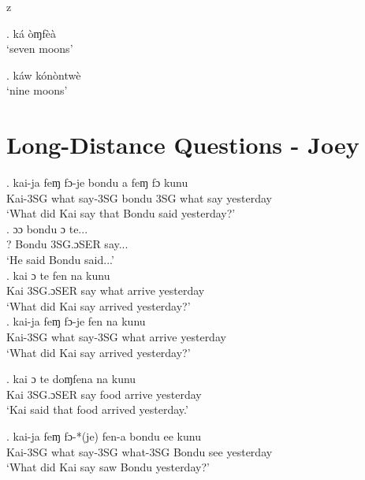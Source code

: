z   \documentclass{assets/fieldnotes}
\begin{document}
\ex. ká òɱfèà \\
`seven moons'

\ex. káw kónòntwè \\ 
`nine moons' 






\section{Long-Distance Questions - Joey}

\exg. kai-ja feɱ fɔ-je bondu a feɱ fɔ kunu\\
Kai-3SG what say-3SG bondu 3SG what say yesterday\\
`What did Kai say that Bondu said yesterday?'\\ 

\exg. ɔɔ bondu ɔ te... \\
? Bondu 3SG.ɔSER say...\\
`He said Bondu said...'\\ 

\exg. kai ɔ te fen na kunu\\
Kai 3SG.ɔSER say what arrive yesterday\\
`What did Kai say arrived yesterday?'\\ 

\exg. kai-ja feɱ fɔ-je fen na kunu\\
Kai-3SG what say-3SG what arrive yesterday\\
`What did Kai say arrived yesterday?'\\ 


\exg. kai ɔ te doɱfena na kunu\\
Kai 3SG.ɔSER say food arrive yesterday\\
`Kai said that food arrived yesterday.'\\ 


\exg. kai-ja feɱ fɔ-*(je) fen-a bondu ee kunu   \\
Kai-3SG what say-3SG what-3SG Bondu see yesterday\\
`What did Kai say saw Bondu yesterday?'\\ 

\end{document}
